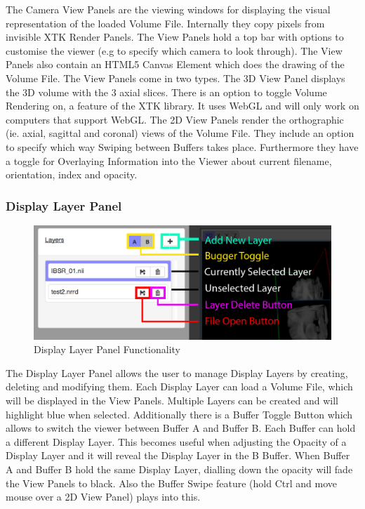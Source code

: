 \documentclass[a4paper,11pt,titlepage]{article}
\begin{document}
The Camera View Panels are the viewing windows for displaying the visual representation of the loaded Volume File. Internally they copy pixels from invisible XTK Render Panels. The View Panels hold a top bar with options to customise the viewer (e.g to specify which camera to look through). The View Panels also contain an HTML5 Canvas Element which does the drawing of the Volume File. The View Panels come in two types. The 3D View Panel displays the 3D volume with the 3 axial slices. There is an option to toggle Volume Rendering on, a feature of the XTK library. It uses WebGL and will only work on computers that support WebGL. The 2D View Panels render the orthographic (ie. axial, sagittal and coronal) views of the Volume File. They include an option to specify which way Swiping between Buffers takes place. Furthermore they have a toggle for Overlaying Information into the Viewer about current filename, orientation, index and opacity.




\subsubsection{Display Layer Panel}

\begin{figure}[ht!]
\centering
\includegraphics[width=140mm]{graphics/features_03.png}
\caption{Display Layer Panel Functionality}
\label{fig:UIdesign1}
\end{figure}

The Display Layer Panel allows the user to manage Display Layers by creating, deleting and modifying them. Each Display Layer can load a Volume File, which will be displayed in the View Panels. Multiple Layers can be created and will highlight blue when selected. Additionally there is a Buffer Toggle Button which allows to switch the viewer between Buffer A and Buffer B. Each Buffer can hold a different Display Layer. This becomes useful when adjusting the Opacity of a Display Layer and it will reveal the Display Layer in the B Buffer. When Buffer A and Buffer B hold the same Display Layer, dialling down the opacity will fade the View Panels to black. Also the Buffer Swipe feature (hold Ctrl and move mouse over a 2D View Panel) plays into this.
\end{document}

